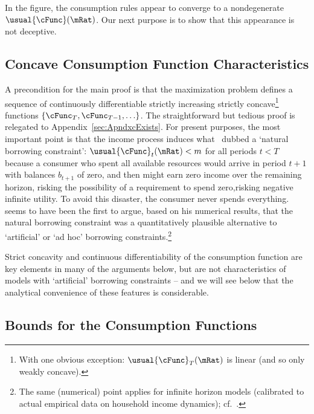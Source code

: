 \documentclass[BufferStockTheory]{subfiles}
\begin{document}
In the figure, the consumption rules appear to converge to a nondegenerate $\usual{\cFunc}(\mRat)$.
Our next purpose is to show that this appearance is not deceptive.  \hypertarget{Concave-Consumption-Function-Characteristics}{}

\subsection{Concave Consumption Function Characteristics}\label{sec:cExists}

A precondition for the main proof is that the maximization problem defines a sequence of continuously differentiable strictly increasing strictly concave\footnote{With one obvious exception: $\usual{\cFunc}_{T}(\mRat)$ is linear (and so only weakly concave).} functions $\{\cFunc_{T},\cFunc_{T-1},\ldots\}$.  The straightforward but tedious proof is relegated to Appendix~\ref{sec:ApndxcExists}.  For present purposes, the most important point is that the income process induces what~\cite{aiyagari:ge} dubbed a `natural borrowing constraint':  $\usual{\cFunc}_{t}(\mRat) < m$ for all periods $t < T$ because a consumer who spent all available resources would arrive in period $t+1$ with balances $b_{t+1}$ of zero, and then might earn zero income over the remaining horizon, risking the possibility of a requirement to spend zero,risking negative infinite utility.  To avoid this disaster, the consumer never spends everything.~~\cite{zeldesStochastic} seems to have been the first to argue, based on his numerical results, that the natural borrowing constraint was a quantitatively plausible alternative to `artificial' or `ad hoc' borrowing constraints.\footnote{The same (numerical) point applies for infinite horizon models (calibrated to actual empirical data on household income dynamics); cf.~\cite{carrollBrookings}.}

Strict concavity and continuous differentiability of the consumption function are key elements in many of the arguments below, but are not characteristics of models with `artificial' borrowing constraints -- and we will see below that the analytical convenience of these features is considerable.%

\hypertarget{Bounds-for-the-Consumption-Functions}{}
\subsection{Bounds for the Consumption Functions}\label{subsec:cFuncBounds}
\end{document}
